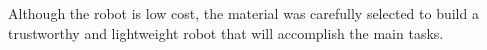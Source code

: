 \documentclass[preprint,12pt,3p]{elsarticle}
\begin{document}
Although the robot is low cost, the material was carefully selected to build a trustworthy and lightweight robot that will accomplish the main tasks.




% 
% 
% 
% 
% 
% 
% 
% 
% 
% 
% 
% 


\end{document}
